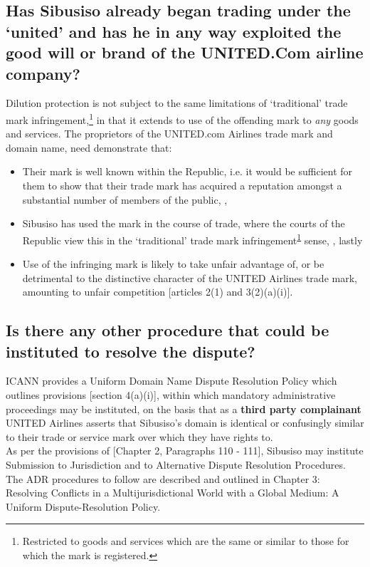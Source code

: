 \documentclass[11pt]{article}
\begin{document}
\subsection{Has Sibusiso already began trading under the `united' and has he in any way exploited the good will or brand of the UNITED.Com airline company?}
\label{sec:org9fe0ed5}
Dilution protection is not subject to the same limitations of `traditional'
trade mark infringement,\footnote{Restricted to goods and services which are the same or similar to those for which the mark is registered.\label{orgf35f312}} in that it extends to use of the offending mark to
\emph{any} goods and services. The proprietors of the UNITED.com Airlines trade
mark and domain name, need demonstrate that:
\begin{itemize}
\item Their mark is well known within the Republic, i.e. it would be sufficient for
them to show that their trade mark has acquired a reputation amongst a
substantial number of members of the public,
 \cite{corbett97_mcd_v_joburgers},
\item Sibusiso has used the mark in the course of trade, where the courts of
the Republic view this in the `traditional' trade mark infringement\textsuperscript{\ref{orgf35f312}}
sense,  \cite{harms01_cowbell_v_ics}, lastly
\item Use of the infringing mark is likely to take unfair advantage of, or be
detrimental to the distinctive character of the UNITED Airlines trade mark,
amounting to unfair competition [articles 2(1) and 3(2)(a)(i)]\cite{wipo96_model_provi_unfair_comp}.
\end{itemize}

\subsection{Is there any other procedure that could be instituted to resolve the dispute?}
\label{sec:orgc84f34a}
ICANN provides a Uniform Domain Name Dispute Resolution Policy which outlines
provisions [section 4(a)(i)]\cite{icann99_policy}, within which mandatory
administrative proceedings may be instituted, on the basis that as a \textbf{third
party complainant} UNITED Airlines asserts that Sibusiso's domain is identical
or confusingly similar to their trade or service mark over which they have
rights to.\\

As per the provisions of [Chapter 2, Paragraphs 110 -
111]\cite{wipo99_management_dns_ip_report}, Sibusiso may institute Submission to
Jurisdiction and to Alternative Dispute Resolution Procedures. The ADR procedures to
follow are described and outlined in Chapter 3: Resolving Conflicts in a
Multijurisdictional World with a Global Medium: A Uniform Dispute-Resolution
Policy.
\end{document}
